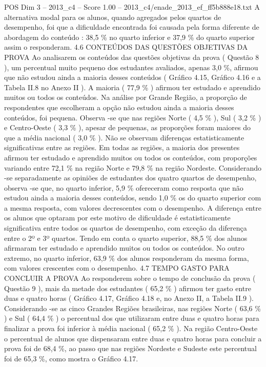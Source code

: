 \begin{textsample}{POS Dim 3 – 2013\_c4 – Score 1.00 – 2013\_c4/enade\_2013\_ef\_ff5b888e18.txt}
A alternativa modal para os alunos, quando agregados pelos quartos de desempenho, foi que a dificuldade encontrada foi causada pela forma diferente de abordagem do conteúdo : 38,5 \% no quarto inferior e 37,9 \% do quarto superior assim o responderam. 4.6 CONTEÚDOS DAS QUESTÕES OBJETIVAS DA PROVA Ao analisarem os conteúdos das questões objetivas da prova ( Questão 8 ), um percentual muito pequeno dos estudantes avaliados, apenas 3,0 \%, afirmou que não estudou ainda a maioria desses conteúdos ( Gráfico 4.15, Gráfico 4.16 e a Tabela II.8 no Anexo II ).
A maioria ( 77,9 \% ) afirmou ter estudado e aprendido muitos ou todos os conteúdos.
Na análise por Grande Região, a proporção de respondentes que escolheram a opção não estudou ainda a maioria desses conteúdos, foi pequena.
Observa -se que nas regiões Norte ( 4,5 \% ), Sul ( 3,2 \% ) e Centro-Oeste ( 3,3 \% ), apesar de pequenas, as proporções foram maiores do que a média nacional ( 3,0 \% ).
Não se observam diferenças estatisticamente significativas entre as regiões.
Em todas as regiões, a maioria dos presentes afirmou ter estudado e aprendido muitos ou todos os conteúdos, com proporções variando entre 72,1 \% na região Norte e 79,8 \% na região Nordeste.
Considerando -se separadamente as opiniões de estudantes dos quatro quartos de desempenho, observa -se que, no quarto inferior, 5,9 \% ofereceram como resposta que não estudou ainda a maioria desses conteúdos, sendo 1,0 \% os do quarto superior com a mesma resposta, com valores decrescentes com o desempenho.
A diferença entre os alunos que optaram por este motivo de dificuldade é estatisticamente significativa entre todos os quartos de desempenho, com exceção da diferença entre o 2º e 3º quartos.
Tendo em conta o quarto superior, 88,5 \% dos alunos afirmaram ter estudado e aprendido muitos ou todos os conteúdos.
No outro extremo, no quarto inferior, 63,9 \% dos alunos responderam da mesma forma, com valores crescentes com o desempenho. 4.7 TEMPO GASTO PARA CONCLUIR A PROVA Ao responderem sobre o tempo de conclusão da prova ( Questão 9 ), mais da metade dos estudantes ( 65,2 \% ) afirmou ter gasto entre duas e quatro horas ( Gráfico 4.17, Gráfico 4.18 e, no Anexo II, a Tabela II.9 ).
Considerando -se as cinco Grandes Regiões brasileiras, nas regiões Norte ( 63,6 \% ) e Sul ( 64,4 \% ) o percentual dos que utilizaram entre duas e quatro horas para finalizar a prova foi inferior à média nacional ( 65,2 \% ).
Na região Centro-Oeste o percentual de alunos que dispensaram entre duas e quatro horas para concluir a prova foi de 68,4 \%, ao passo que nas regiões Nordeste e Sudeste este percentual foi de 65,3 \%, como mostra o Gráfico 4.17.

\end{textsample}
